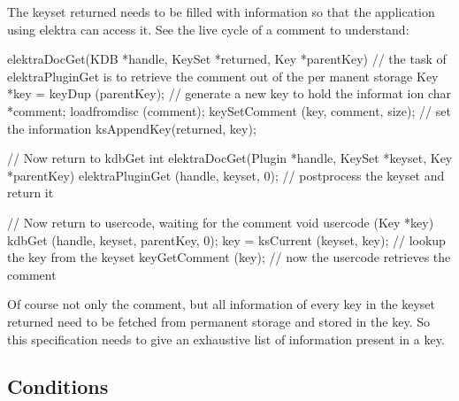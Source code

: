The keyset {\ttfamily returned} needs to be filled with information so that the application using elektra can access it. See the live cycle of a comment to understand: 
\begin{DoxyCode}
elektraDocGet(KDB *handle, KeySet *returned, Key *parentKey)
{
        // the task of elektraPluginGet is to retrieve the comment out of the per
      manent storage
        Key *key = keyDup (parentKey); // generate a new key to hold the informat
      ion
        char *comment;
        loadfromdisc (comment);
        keySetComment (key, comment, size); // set the information
        ksAppendKey(returned, key);
}

// Now return to kdbGet
int elektraDocGet(Plugin *handle, KeySet *keyset, Key *parentKey)
{
        elektraPluginGet (handle, keyset, 0);
        // postprocess the keyset and return it
}

// Now return to usercode, waiting for the comment
void usercode (Key *key)
{
        kdbGet (handle, keyset, parentKey, 0);
        key = ksCurrent (keyset, key); // lookup the key from the keyset
        keyGetComment (key); // now the usercode retrieves the comment
}
\end{DoxyCode}
 Of course not only the comment, but all information of every key in the keyset {\ttfamily returned} need to be fetched from permanent storage and stored in the key. So this specification needs to give an exhaustive list of information present in a key.\hypertarget{group__plugin_conditions}{}\subsection{Conditions}\label{group__plugin_conditions}
